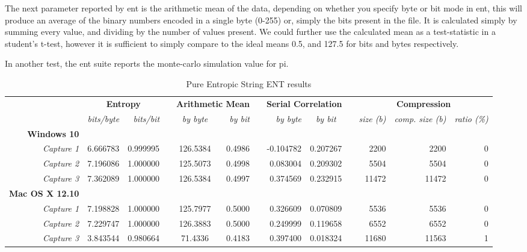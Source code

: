 \documentclass{IEEEtran}
\begin{document}
The next parameter reported by ent is the arithmetic mean of the data, depending on whether you specify byte or bit mode in ent, this will produce an average of the binary numbers encoded in a single byte (0-255) or, simply the bits present in the file. It is calculated simply by summing every value, and dividing by the number of values present. We could further use the calculated mean as a test-statistic in a student's t-test, however it is sufficient to simply compare to the ideal means 0.5, and 127.5 for bits and bytes respectively.

In another test, the ent suite reports the monte-carlo simulation value for pi. 






\begin{table*}[h!]
\begin{adjustwidth}{-1.25 cm}{}
\centering
\caption{Pure Entropic String ENT results}
\begin{tabular}{@{}rrrrcrrrcrrrr@{}}\toprule
& \multicolumn{2}{c}{\textbf{Entropy}} & \phantom{abc}& \multicolumn{2}{c}{\textbf{Arithmetic Mean}} &
\phantom{abc} & \multicolumn{2}{c}{\textbf{Serial Correlation}} & \phantom{abc} &\multicolumn{3}{c}{\textbf{Compression}}\\
\cmidrule{2-3} \cmidrule{5-6} \cmidrule{8-9} \cmidrule{11-13}
& \textit{bits/byte} & \textit{bits/bit}  && \textit{by byte} & \textit{by bit} && \textit{by byte} & \textit{by bit} && \textit{size (b)} & \textit{comp. size (b)} & \textit{ratio (\%)}\\ \midrule
\textbf{Windows 10}\\
\textit{Capture 1} & 6.666783 & 0.999995  && 126.5384 & 0.4986  && -0.104782 & 0.207267 && 2200 & 2200 & 0\\
\textit{Capture 2}& 7.196086& 1.000000&& 125.5073& 0.4998&& 0.083004& 0.209302 && 5504 & 5504 & 0\\
\textit{Capture 3}& 7.362089& 1.000000&& 126.5384& 0.4997&& 0.374569& 0.232915 && 11472 & 11472 & 0\\
\textbf{Mac OS X 12.10}\\
\textit{Capture 1} & 7.198828 & 1.000000  && 125.7977 & 0.5000 && 0.326609 & 0.070809 && 5536 & 5536 & 0 \\
\textit{Capture 2}& 7.229747& 1.000000&& 126.3883& 0.5000&& 0.249999& 0.119658 && 6552 & 6552 & 0\\
\textit{Capture 3}& 3.843544& 0.980664&& 71.4336& 0.4183&& 0.397400&  0.018324 && 11680 & 11563 & 1 \\

\end{tabular}
\end{adjustwidth}
\end{table*}
\end{document}
